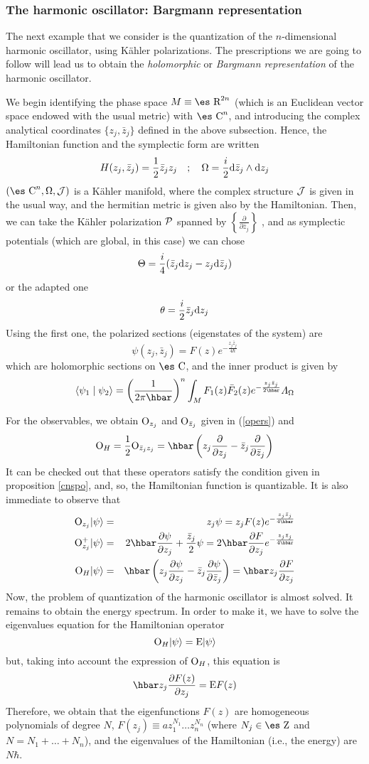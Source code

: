 \documentclass[12pt]{article}
\theoremstyle{plain}
\def\beann{\begin{eqnarray*}}
\def\eeann{\end{eqnarray*}}
\def\dst{\(}
\def\derpar#1#2{\frac{\partial{#1}}{\partial{#2}}}
\def\d{{\rm d}}
\def\P{{\cal P}}
\def\sta{|\psi \rangle }
\def\Op{{\rm O}}
\def\Zahl{\mbox{\es Z}}
\def\Real{\mbox{\es R}}
\def\Complex{\mbox{\es C}}
\def\LF{{\mit\Lambda}_{\Omega}}
\begin{document}
\subsubsection{The harmonic oscillator: Bargmann representation}


The next example that we consider
is the quantization of the $n$-dimensional harmonic oscillator,
using K\"ahler polarizations.
The prescriptions we are going to follow
will lead us to obtain the
{\it holomorphic} or {\it Bargmann representation}
of the harmonic oscillator.

We begin  identifying the phase space
$M \equiv \Real^{2n}$
(which is an Euclidean vector space endowed with the usual metric)
with $\Complex^n$,
and introducing the complex analytical coordinates
$\{ z_j, \bar z_j \}$
defined in the above subsection.
Hence, the Hamiltonian function
and the symplectic form are written
$$
H(z_j,\bar z_j)=\frac{1}{2}\bar z_j z_j
\quad ; \quad
\Omega=\frac{i}{2} \d \bar z_j \wedge \d z_j
$$
$(\Complex^n ,\Omega ,{\cal J})$ is a K\"ahler manifold,
where the complex structure ${\cal J}$ is given in the usual way,
and the hermitian metric is given also by the Hamiltonian.
Then, we can take the K\"ahler polarization $\P$ spanned by
\dst\left\{ \derpar{}{\bar z_j} \right\}\) , and as symplectic
potentials
(which are global, in this case)
we can chose
$$
\Theta = \frac{i}{4}(\bar z_j \d z_j - z_j \d \bar z_j)
$$
or the adapted one
$$
\theta = \frac{i}{2}\bar z_j\d z_j
$$
Using the first one, the polarized sections
(eigenstates of the system) are
$$
\psi (z_j,\bar z_j) = F(z) e^{-\frac{z_j \bar z_j}{4\hbar}}
$$
which are holomorphic sections on $\Complex$,
and the inner product is given by
$$
\langle \psi_1 \mid \psi_2\rangle  =\left( \frac{1}{2\pi \hbar}
\right)^n
\int_M F_1(z)\bar F_2(z) e^{-\frac{z_j\bar z_j}{2\hbar}}\LF
$$

For the observables, we obtain
$\Op_{z_j}$ and $\Op_{\bar z_j}$ given in
(\ref{opers}) and
$$
\Op_H = \frac{1}{2}\Op_{\bar z_j z_j} =
\hbar \left( z_j\derpar{}{z_j}-\bar z_j \derpar{}{\bar z_j} \right)
$$
It can be checked out that these operators
satisfy the condition given in proposition
\ref{cnspo}, and, so, the Hamiltonian function is quantizable.
It is also immediate to observe that
\beann
\Op_{z_j} \sta &=& z_j \psi = z_j F(z)e^{-\frac{z_j\bar z_j}{4\hbar}}
\\
\Op_{z_j}^+\sta &=& 2\hbar\derpar{\psi}{z_j}+\frac{\bar z_j}{2}\psi
= 2\hbar\derpar{F}{z_j}e^{-\frac{z_j\bar z_j}{4\hbar}}
\\
\Op_H\sta &=& \hbar\left( z_j\derpar{\psi}{z_j} -\bar
z_j\derpar{\psi}{\bar z_j}\right) = \hbar z_j \derpar{F}{z_j}
\eeann
Now, the problem of quantization of the harmonic oscillator
is almost solved. It remains to obtain the
energy spectrum. In order to make it,
we have to solve the eigenvalues equation
for the Hamiltonian operator
$$
\Op_H \sta = {\rm E} \sta
$$
but, taking into account the expression of $\Op_H$,
this equation is
$$
\hbar z_j \derpar{F(z)}{z_j} = {\rm E} F(z)
$$
Therefore, we obtain that
the eigenfunctions $F(z)$ are homogeneous polynomials
of degree $N$, $F(z_j) \equiv a z_1^{N_1}\ldots z_n^{N_n}$
(where $N_j \in \Zahl$ and $N=N_1+\ldots +N_n$), and
the eigenvalues of the Hamiltonian
(i.e., the energy) are $N\hbar$.
\end{document}
